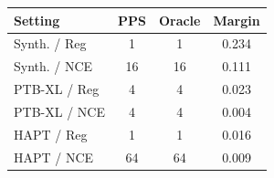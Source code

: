 \caption{Choosing $\lambda$ without labels. \emph{PPS}: the
$\lambda$ our label-free criterion picks; \emph{oracle}: the $\lambda$ maximizing SEP, which
does use labels; \emph{margin}: the gap between the top two $\mathrm{PPS}$ values, where
small is not confident agreement. $n=3$ seeds.}
\label{tab:lambdafree}
\centering
\footnotesize
\setlength{\tabcolsep}{3pt}
\begin{tabular}{lccc}
\hline
Setting & PPS & Oracle & Margin \\
\hline
Synth. / Reg & 1 & 1 & 0.234 \\
Synth. / NCE & 16 & 16 & 0.111 \\
PTB-XL / Reg & 4 & 4 & 0.023 \\
PTB-XL / NCE & 4 & 4 & 0.004 \\
HAPT / Reg & 1 & 1 & 0.016 \\
HAPT / NCE & 64 & 64 & 0.009 \\
\hline
\end{tabular}
